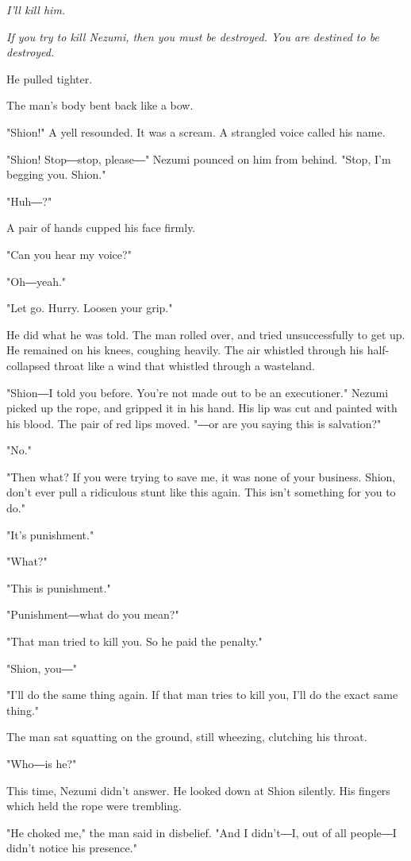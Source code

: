\emph{I'll kill him.}

\emph{If you try to kill Nezumi, then you must be destroyed. You are destined
to be destroyed.}

He pulled tighter.

The man's body bent back like a bow.

"Shion!" A yell resounded. It was a scream. A strangled voice called his
name.

"Shion! Stop―stop, please―" Nezumi pounced on him from behind. "Stop,
I'm begging you. Shion."

"Huh―?"

A pair of hands cupped his face firmly.

"Can you hear my voice?"

"Oh―yeah."

"Let go. Hurry. Loosen your grip."

He did what he was told. The man rolled over, and tried unsuccessfully
to get up. He remained on his knees, coughing heavily. The air whistled
through his half-collapsed throat like a wind that whistled through a
wasteland.

"Shion―I told you before. You're not made out to be an executioner."
Nezumi picked up the rope, and gripped it in his hand. His lip was cut
and painted with his blood. The pair of red lips moved. "―or are you
saying this is salvation?"

"No."

"Then what? If you were trying to save me, it was none of your business.
Shion, don't ever pull a ridiculous stunt like this again. This isn't
something for you to do."

"It's punishment."

"What?"

"This is punishment."

"Punishment―what do you mean?"

"That man tried to kill you. So he paid the penalty."

"Shion, you―"

"I'll do the same thing again. If that man tries to kill you, I'll do
the exact same thing."

The man sat squatting on the ground, still wheezing, clutching his
throat.

"Who―is he?"

This time, Nezumi didn't answer. He looked down at Shion silently. His
fingers which held the rope were trembling.

"He choked me," the man said in disbelief. "And I didn't―I, out of all
people―I didn't notice his presence."

